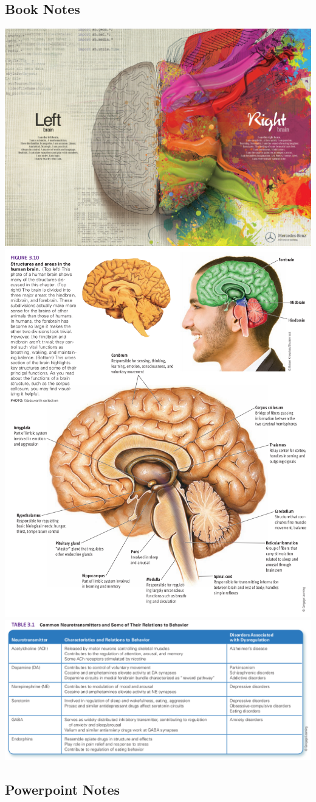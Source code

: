 \documentclass{article}
\begin{document}
\subsection{Book Notes}
\includegraphics[width=\textwidth]{brain_sides.jpg}
\includegraphics[width=\textwidth]{brain}
\includegraphics[width=\textwidth]{neurotransmitters}

\subsection{Powerpoint Notes}

\end{document}
